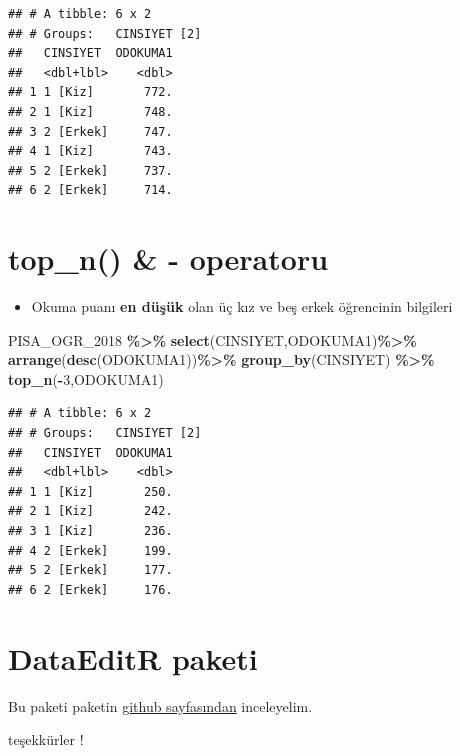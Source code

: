 \documentclass[
  oneside]{book}
\newenvironment{Shaded}{\begin{snugshade}}{\end{snugshade}}
\newcommand{\DecValTok}[1]{\textcolor[rgb]{0.00,0.00,0.81}{#1}}
\newcommand{\FunctionTok}[1]{\textcolor[rgb]{0.13,0.29,0.53}{\textbf{#1}}}
\newcommand{\NormalTok}[1]{#1}
\newcommand{\SpecialCharTok}[1]{\textcolor[rgb]{0.81,0.36,0.00}{\textbf{#1}}}
\providecommand{\tightlist}{%
  \setlength{\itemsep}{0pt}\setlength{\parskip}{0pt}}
\begin{document}
\begin{verbatim}
## # A tibble: 6 x 2
## # Groups:   CINSIYET [2]
##   CINSIYET  ODOKUMA1
##   <dbl+lbl>    <dbl>
## 1 1 [Kiz]       772.
## 2 1 [Kiz]       748.
## 3 2 [Erkek]     747.
## 4 1 [Kiz]       743.
## 5 2 [Erkek]     737.
## 6 2 [Erkek]     714.
\end{verbatim}

\hypertarget{top_n---operatoru}{%
\section{top\_n() \& - operatoru}\label{top_n---operatoru}}

\begin{itemize}
\tightlist
\item
  Okuma puanı \textbf{en düşük} olan üç kız ve beş erkek öğrencinin bilgileri
\end{itemize}

\begin{Shaded}
\begin{Highlighting}[]
\NormalTok{PISA\_OGR\_2018 }\SpecialCharTok{\%\textgreater{}\%}
  \FunctionTok{select}\NormalTok{(CINSIYET,ODOKUMA1)}\SpecialCharTok{\%\textgreater{}\%} 
  \FunctionTok{arrange}\NormalTok{(}\FunctionTok{desc}\NormalTok{(ODOKUMA1))}\SpecialCharTok{\%\textgreater{}\%} 
  \FunctionTok{group\_by}\NormalTok{(CINSIYET) }\SpecialCharTok{\%\textgreater{}\%} 
  \FunctionTok{top\_n}\NormalTok{(}\SpecialCharTok{{-}}\DecValTok{3}\NormalTok{,ODOKUMA1)}
\end{Highlighting}
\end{Shaded}

\begin{verbatim}
## # A tibble: 6 x 2
## # Groups:   CINSIYET [2]
##   CINSIYET  ODOKUMA1
##   <dbl+lbl>    <dbl>
## 1 1 [Kiz]       250.
## 2 1 [Kiz]       242.
## 3 1 [Kiz]       236.
## 4 2 [Erkek]     199.
## 5 2 [Erkek]     177.
## 6 2 [Erkek]     176.
\end{verbatim}

\hypertarget{dataeditr-paketi}{%
\section{DataEditR paketi}\label{dataeditr-paketi}}

Bu paketi paketin \href{https://github.com/DillonHammill/DataEditR}{github sayfasından} inceleyelim.

teşekkürler !

🍵
\end{document}
